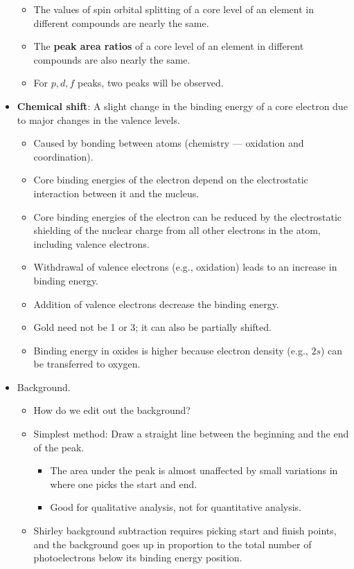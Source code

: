 \documentclass[../notes.tex]{subfiles}
\begin{document}
\begin{itemize}
\begin{itemize}
        \item The values of spin orbital splitting of a core level of an element in different compounds are nearly the same.
        \item The \textbf{peak area ratios} of a core level of an element in different compounds are also nearly the same.
        \item For $p,d,f$ peaks, two peaks will be observed.
    \end{itemize}
    \item \textbf{Chemical shift}: A slight change in the binding energy of a core electron due to major changes in the valence levels.
    \begin{itemize}
        \item Caused by bonding between atoms (chemistry --- oxidation and coordination).
        \item Core binding energies of the electron depend on the electrostatic interaction between it and the nucleus.
        \item Core binding energies of the electron can be reduced by the electrostatic shielding of the nuclear charge from all other electrons in the atom, including valence electrons.
        \item Withdrawal of valence electrons (e.g., oxidation) leads to an increase in binding energy.
        \item Addition of valence electrons decrease the binding energy.
        \item Gold need not be 1 or 3; it can also be partially shifted.
        \item Binding energy in oxides is higher because electron density (e.g., $2s$) can be transferred to oxygen.
    \end{itemize}
    \item Background.
    \begin{itemize}
        \item How do we edit out the background?
        \item Simplest method: Draw a straight line between the beginning and the end of the peak.
        \begin{itemize}
            \item The area under the peak is almost unaffected by small variations in where one picks the start and end.
            \item Good for qualitative analysis, not for quantitative analysis.
        \end{itemize}
        \item Shirley background subtraction requires picking start and finish points, and the background goes up in proportion to the total number of photoelectrons below its binding energy position.

\end{itemize}
\end{itemize}
\end{document}
